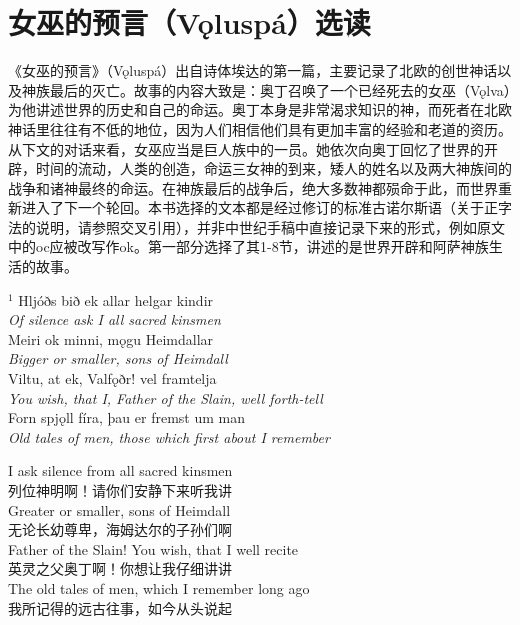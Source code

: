 \section{女巫的预言（Vǫluspá）选读}
《女巫的预言》（Vǫluspá）出自诗体埃达的第一篇，主要记录了北欧的创世神话以及神族最后的灭亡。故事的内容大致是：奥丁召唤了一个已经死去的女巫（Vǫlva）为他讲述世界的历史和自己的命运。奥丁本身是非常渴求知识的神，而死者在北欧神话里往往有不低的地位，因为人们相信他们具有更加丰富的经验和老道的资历。从下文的对话来看，女巫应当是巨人族中的一员。她依次向奥丁回忆了世界的开辟，时间的流动，人类的创造，命运三女神的到来，矮人的姓名以及两大神族间的战争和诸神最终的命运。在神族最后的战争后，绝大多数神都殒命于此，而世界重新进入了下一个轮回。本书选择的文本都是经过修订的标准古诺尔斯语（关于正字法的说明，请参照交叉引用），并非中世纪手稿中直接记录下来的形式，例如原文中的oc应被改写作ok。第一部分选择了其1-8节，讲述的是世界开辟和阿萨神族生活的故事。
\medskip %
\begin{paracol}{2}
    \noindent
    $^1 $ Hljóðs bið ek allar helgar kindir\\
    \textit{Of silence ask I all sacred kinsmen}\\
    Meiri ok minni, mǫgu Heimdallar\footnotemark\\
    \textit{Bigger or smaller, sons of Heimdall}\\
    Viltu, at ek, Valfǫðr\footnotemark! vel framtelja\\
    \textit{You wish, that I, Father of the Slain, well forth-tell}\\
    Forn spjǫll fíra, þau er fremst um man\\
    \textit{Old tales of men, those which first about I remember}\\
    \switchcolumn

    \noindent
    I ask silence from all sacred kinsmen\\
    列位神明啊！请你们安静下来听我讲\\
    Greater or smaller, sons of Heimdall\\
    无论长幼尊卑，海姆达尔的子孙们啊\\
    Father of the Slain! You wish, that I well recite\\
    英灵之父奥丁啊！你想让我仔细讲讲\\
    The old tales of men, which I remember long ago\\
    我所记得的远古往事，如今从头说起\\
\end{paracol}


